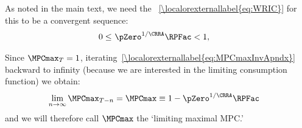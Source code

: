 \documentclass[\econtexRoot/BufferStockTheory]{subfiles}
\begin{document}
As noted in the main text, we need the \WRIC~\eqref{\localorexternallabel{eq:WRIC}} for this to be a convergent sequence:
\begin{equation}\begin{gathered}\begin{aligned}
  0 \leq & ~\pZero^{1/\CRRA} \RPFac < 1 \label{eq:WRICapndx},
\end{aligned}\end{gathered}\end{equation}

Since $\MPCmax_{T}=1$, iterating~\eqref{\localorexternallabel{eq:MPCmaxInvApndx}} backward to
infinity (because we are interested in the limiting consumption function) we obtain:
\begin{equation}\begin{gathered}\begin{aligned}
\lim_{n\rightarrow\infty}\MPCmax_{T-n} 
& = \MPCmax \equiv 1-\pZero^{1/\CRRA}\RPFac  \label{eq:MPCmaxDef}
\end{aligned}\end{gathered}\end{equation}
and we will therefore call $\MPCmax$ the `limiting maximal MPC.'
\end{document}
